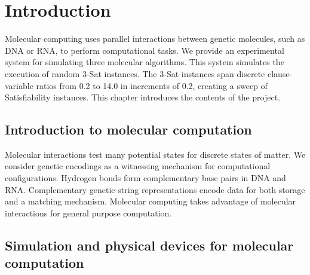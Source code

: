 \chapter{Introduction}


Molecular computing uses parallel interactions between genetic molecules, such as DNA or RNA, to perform computational tasks.  We provide an experimental system for simulating three molecular algorithms.  This system simulates the execution of random $3$-{\sc Sat} instances.  The $3$-{\sc Sat} instances span discrete clause-variable ratios from 0.2 to 14.0 in increments of 0.2, creating a sweep of {\sc Satisfiability} instances.  This chapter introduces the contents of the project.

\section{Introduction to molecular computation}
	
				
Molecular interactions test many potential states for discrete states of matter.  We consider genetic encodings as a witnessing mechanism for computational configurations.  Hydrogen bonds form complementary base pairs in DNA and RNA.  Complementary genetic string representations encode data for both storage and a matching mechanism.  Molecular computing takes advantage of molecular interactions for general purpose computation.

				
\section{Simulation and physical devices for molecular computation}
	

